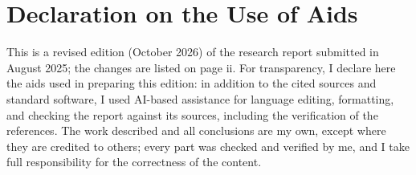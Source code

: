 \chapter*{Declaration on the Use of Aids}

This is a revised edition (October 2026) of the research report submitted in August 2025; the changes are listed on page ii. For transparency, I declare here the aids used in preparing this edition: in addition to the cited sources and standard software, I used AI-based assistance for language editing, formatting, and checking the report against its sources, including the verification of the references. The work described and all conclusions are my own, except where they are credited to others; every part was checked and verified by me, and I take full responsibility for the correctness of the content.
